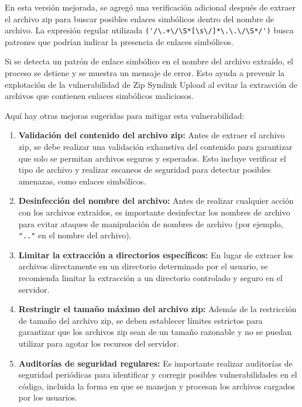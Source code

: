 \documentclass[a4paper]{article} %
\begin{document}

    En esta versión mejorada, se agregó una verificación adicional después de extraer el archivo zip para buscar posibles enlaces simbólicos dentro del nombre de archivo. La expresión regular utilizada \verb|('/\.+\/\S*[\s\/]*\.\.\/\S*/')| busca patrones que podrían indicar la presencia de enlaces simbólicos.

    Si se detecta un patrón de enlace simbólico en el nombre del archivo extraído, el proceso se detiene y se muestra un mensaje de error. Esto ayuda a prevenir la explotación de la vulnerabilidad de Zip Symlink Upload al evitar la extracción de archivos que contienen enlaces simbólicos maliciosos.

    \clearpage

    Aquí hay otras mejoras sugeridas para mitigar esta vulnerabilidad:

    \begin{enumerate}[label=\textit{\arabic*.}]
        \item \textbf{Validación del contenido del archivo zip:} Antes de extraer el archivo zip, se debe realizar una validación exhaustiva del contenido para garantizar que solo se permitan archivos seguros y esperados. Esto incluye verificar el tipo de archivo y realizar escaneos de seguridad para detectar posibles amenazas, como enlaces simbólicos.
        \item \textbf{Desinfección del nombre del archivo:} Antes de realizar cualquier acción con los archivos extraídos, es importante desinfectar los nombres de archivo para evitar ataques de manipulación de nombres de archivo (por ejemplo, \verb|".."| en el nombre del archivo).
        \item \textbf{Limitar la extracción a directorios específicos:} En lugar de extraer los archivos directamente en un directorio determinado por el usuario, se recomienda limitar la extracción a un directorio controlado y seguro en el servidor.
        \item \textbf{Restringir el tamaño máximo del archivo zip:}  Además de la restricción de tamaño del archivo zip, se deben establecer límites estrictos para garantizar que los archivos zip sean de un tamaño razonable y no se puedan utilizar para agotar los recursos del servidor.
        \item \textbf{Auditorías de seguridad regulares:}  Es importante realizar auditorías de seguridad periódicas para identificar y corregir posibles vulnerabilidades en el código, incluida la forma en que se manejan y procesan los archivos cargados por los usuarios.
    \end{enumerate}
    
\end{document}
